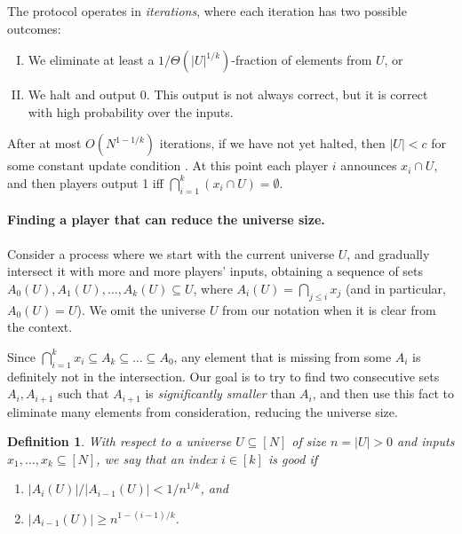 \documentclass{article}
\newcommand{\TODO}[1]{ {\color{red} #1 }}
\theoremstyle{plain}
\newtheorem{definition}{Definition}
\begin{document}
The protocol operates in \emph{iterations}, where each iteration has two possible outcomes:
\begin{enumerate}[I.]
  \item We eliminate at least a $1/\Theta(|U|^{1/k})$-fraction of elements from $U$, or
  \item We halt and output 0. This output is not always correct, but it is correct with high probability over the inputs.
\end{enumerate}
After at most $O(N^{1 - 1/k})$ iterations, if we have not yet halted,
then $|U| < c$ for some constant \TODO{update condition}. At this point each player $i$ announces $x_i \cap U$,
and then players output 1 iff $\bigcap_{i = 1}^k (x_i \cap U) = \emptyset$.


\paragraph{Finding a player that can reduce the universe size.}
Consider a process where we start with the current universe $U$,
and gradually intersect it with more and more players' inputs, 
obtaining a sequence of sets $A_0(U), A_1(U),\ldots,A_k(U) \subseteq U$,
where $A_i(U) = \bigcap_{j \leq i} x_j$ (and in particular, $A_0(U) = U$).
We omit the universe $U$ from our notation when it is clear from the context.

Since $\bigcap_{i = 1}^k x_i \subseteq A_k \subseteq \ldots \subseteq A_0$,
any element that is missing from some $A_i$ is definitely not in the intersection.
Our goal is to try to find two consecutive sets $A_i, A_{i+1}$ such that $A_{i+1}$ is \emph{significantly smaller} than $A_i$,
and then use this fact to eliminate many elements from consideration, reducing the universe size.

\begin{definition}
  With respect to a universe $U \subseteq [N]$ of size $n = |U| > 0$ and inputs $x_1,\ldots,x_k \subseteq [N]$,
  we say that an index $i \in [k]$ is \emph{good} if
  \begin{enumerate}
    \item $|A_i(U)| / |A_{i-1}(U)| < 1/n^{1/k}$, and
    \item $|A_{i-1}(U)| \geq n^{1-(i-1)/k}$.
  \end{enumerate}
  \label{def:good}
\end{definition}
\end{document}
